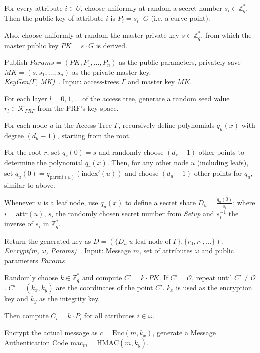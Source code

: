 For every attribute $i \in U$, choose uniformly at random a secret number $s_i \in \mathbb{Z}_q^*$.
Then the public key of attribute $i$ is $P_i = s_i \cdot G$ (i.e. a curve point).

Also, choose uniformly at random the master private key $s \in \mathbb{Z}_q^*$, from which the master public key $PK = s \cdot G$ is derived.

Publish $Params=(PK, P_1, \dots, P_n)$ as the public parameters, privately save $MK = (s, s_1, \dots, s_n)$ as the private master key.
\\

\emph{KeyGen($\Gamma$, MK)}~\cite{yao_lightweight_2015}.
Input: \glspl{access-tree} $\Gamma$ and master key $MK$.

For each layer $l = 0, 1, \dots$ of the access tree, generate a random seed value $r_l \in \mathcal{K}_{PRF}$ from the PRF's key space.

For each node $u$ in the Access Tree $\Gamma$, recursively define polynomials $q_u(x)$ with degree $(d_u - 1)$, starting from the root.

For the root $r$, set $q_r(0) = s$ and randomly choose $(d_r - 1)$ other points to determine the polynomial $q_r(x)$.
Then, for any other node $u$ (including leafs), set $q_u(0) = q_{\text{parent}(u)}(\text{index}'(u))$ and choose $(d_u -1)$ other points for $q_u$, similar to above.

Whenever $u$ is a leaf node, use $q_u(x)$ to define a secret share $D_u = \frac{q_u(0)}{s_i}$; where $i = \text{attr}(u)$, $s_i$ the randomly chosen secret number from \emph{Setup} and $s_i^{-1}$ the inverse of $s_i$ in $\mathbb{Z}_q^*$.

Return the generated key as $D = (\{D_u | u \text{ leaf node of } \Gamma\}, \{r_0, r_1, \dots \})$.\\

\emph{Encrypt(m, $\omega$, Params)}~\cite{yao_lightweight_2015}.
Input: Message $m$, set of attributes $\omega$ and public parameters $Params$.

Randomly choose $k \in \mathbb{Z}_q^*$ and compute $C' = k \cdot PK$. If $C' = \mathcal{O}$, repeat until $C' \neq \mathcal{O}$.
$C' = (k_x, k_y)$ are the coordinates of the point $C'$. $k_x$ is used as the encryption key and $k_y$ as the integrity key.

Then compute $C_i = k \cdot P_i$ for all attributes $i \in \omega$.

Encrypt the actual message as $c = \text{Enc}(m, k_x)$, generate a Message Authentication Code $\text{mac}_m = \text{HMAC}(m, k_y)$.

